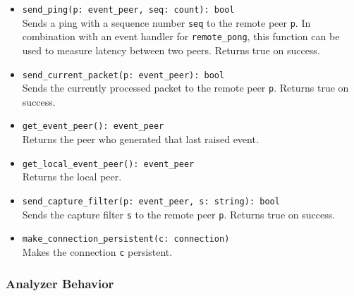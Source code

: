 \documentclass[10pt,landscape]{article}
\newcommand{\ReturnsTrueOnSuccess}{Returns true on success.\xspace}
\begin{document}
\begin{multicols*}{2}
\begin{itemize}
    initial handshake.
    \ReturnsTrueOnSuccess
  \item \verb|send_ping(p: event_peer, seq: count): bool|\\
    Sends a ping with a sequence number \verb|seq| to the remote peer \verb|p|.
    In combination with an event handler for \verb|remote_pong|, this function
    can be used to measure latency between two peers.
    \ReturnsTrueOnSuccess
  \item \verb|send_current_packet(p: event_peer): bool|\\
    Sends the currently processed packet to the remote peer \verb|p|.
    \ReturnsTrueOnSuccess
  \item \verb|get_event_peer(): event_peer|\\
    Returns the peer who generated that last raised event.
  \item \verb|get_local_event_peer(): event_peer|\\
    Returns the local peer.
  \item \verb|send_capture_filter(p: event_peer, s: string): bool|\\
    Sends the capture filter \verb|s| to the remote peer \verb|p|.
    \ReturnsTrueOnSuccess
  \item \verb|make_connection_persistent(c: connection)|\\
    Makes the connection \verb|c| persistent.
\end{itemize}

\subsubsection*{Analyzer Behavior}


\end{multicols*}
\end{document}
